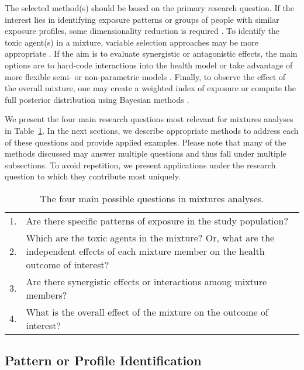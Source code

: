 The selected method(s) should be based on the primary research question. If the interest lies in identifying exposure patterns or groups of people with similar exposure profiles, some dimensionality reduction is required \citep{jolliffe02, jolliffe02b, thompson04, paatero94}. To identify the toxic agent(s) in a mixture, variable selection approaches may be more appropriate \citep{tibshirani96, zou05}. If the aim is to evaluate synergistic or antagonistic effects, the main options are to hard-code interactions into the health model or take advantage of more flexible semi- or non-parametric models \citep{bobb2014bayesian,coull2015,bobb2018statistical}. Finally, to observe the effect of the overall mixture, one may create a weighted index of exposure or compute the full posterior distribution using Bayesian methods \citep{carrico15,bobb2014bayesian,coull2015}.

We present the four main research questions most relevant for mixtures analyses in Table~\ref{tab:qx}. In the next sections, we describe appropriate methods to address each of these questions and provide applied examples. Please note that many of the methods discussed may answer multiple questions and thus fall under multiple subsections. To avoid repetition, we present applications under the research question to which they contribute most uniquely. \\

\begin{table}[ht]
\begin{center}
\caption{The four main possible questions in mixtures analyses.}
\label{tab:qx}
\begin{tabular}{|c p{15cm}|}
\hline
  1. & Are there specific patterns of exposure in the study population? \\
  2. & Which are the toxic agents in the mixture? Or, what are the independent effects of each mixture member on the health outcome of interest? \\
  3. & Are there synergistic effects or interactions among mixture members? \\
  4. & What is the overall effect of the mixture on the outcome of interest? \\
\hline
\end{tabular}
\end{center}
\end{table}

\subsection{Pattern or Profile Identification}\label{sec:Patterns}

